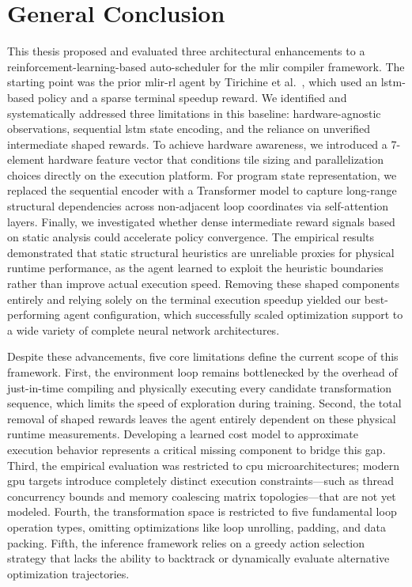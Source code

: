 \chapter*{General Conclusion}
\label{ch:conclusion}

This thesis proposed and evaluated three architectural enhancements to a reinforcement-learning-based auto-scheduler for the \gls{mlir} compiler framework. The starting point was the prior \gls{mlir}-\gls{rl} agent by Tirichine et al.~\cite{tirichine2025reinforcement}, which used an \gls{lstm}-based policy and a sparse terminal speedup reward. We identified and systematically addressed three limitations in this baseline: hardware-agnostic observations, sequential \gls{lstm} state encoding, and the reliance on unverified intermediate shaped rewards. To achieve hardware awareness, we introduced a 7-element hardware feature vector that conditions tile sizing and parallelization choices directly on the execution platform. For program state representation, we replaced the sequential encoder with a Transformer model to capture long-range structural dependencies across non-adjacent loop coordinates via self-attention layers. Finally, we investigated whether dense intermediate reward signals based on static analysis could accelerate policy convergence. The empirical results demonstrated that static structural heuristics are unreliable proxies for physical runtime performance, as the agent learned to exploit the heuristic boundaries rather than improve actual execution speed. Removing these shaped components entirely and relying solely on the terminal execution speedup yielded our best-performing agent configuration, which successfully scaled optimization support to a wide variety of complete neural network architectures.

Despite these advancements, five core limitations define the current scope of this framework. First, the environment loop remains bottlenecked by the overhead of just-in-time compiling and physically executing every candidate transformation sequence, which limits the speed of exploration during training. Second, the total removal of shaped rewards leaves the agent entirely dependent on these physical runtime measurements. Developing a learned cost model to approximate execution behavior represents a critical missing component to bridge this gap. Third, the empirical evaluation was restricted to \gls{cpu} microarchitectures; modern \gls{gpu} targets introduce completely distinct execution constraints—such as thread concurrency bounds and memory coalescing matrix topologies—that are not yet modeled. Fourth, the transformation space is restricted to five fundamental loop operation types, omitting optimizations like loop unrolling, padding, and data packing. Fifth, the inference framework relies on a greedy action selection strategy that lacks the ability to backtrack or dynamically evaluate alternative optimization trajectories.


